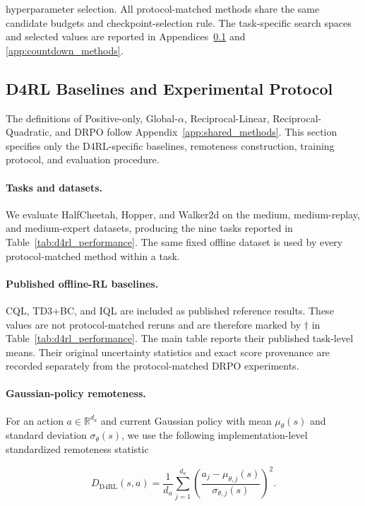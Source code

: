 hyperparameter selection. All protocol-matched methods share the same
candidate budgets and checkpoint-selection rule. The task-specific
search spaces and selected values are reported in
Appendices~\ref{app:d4rl_methods} and
\ref{app:countdown_methods}.


\subsection{D4RL Baselines and Experimental Protocol}
\label{app:d4rl_methods}

The definitions of Positive-only, Global-\(\alpha\),
Reciprocal-Linear, Reciprocal-Quadratic, and DRPO follow
Appendix~\ref{app:shared_methods}. This section specifies only the
D4RL-specific baselines, remoteness construction, training protocol,
and evaluation procedure.

\paragraph{Tasks and datasets.}

We evaluate HalfCheetah, Hopper, and Walker2d on the medium,
medium-replay, and medium-expert datasets, producing the nine tasks
reported in Table~\ref{tab:d4rl_performance}. The same fixed offline
dataset is used by every protocol-matched method within a task.

\paragraph{Published offline-RL baselines.}

CQL, TD3+BC, and IQL are included as published reference results.
These values are not protocol-matched reruns and are therefore marked
by \(\dagger\) in Table~\ref{tab:d4rl_performance}. The main table
reports their published task-level means. Their original uncertainty
statistics and exact score provenance are recorded separately from the
protocol-matched DRPO experiments.

\paragraph{Gaussian-policy remoteness.}

For an action \(a\in\mathbb{R}^{d_a}\) and current Gaussian policy with
mean \(\mu_\theta(s)\) and standard deviation \(\sigma_\theta(s)\), we use the
following implementation-level standardized remoteness statistic

\[
D_{\mathrm{D4RL}}(s,a)
=
\frac{1}{d_a}
\sum_{j=1}^{d_a}
\left(
\frac{a_j-\mu_{\theta,j}(s)}
     {\sigma_{\theta,j}(s)}
\right)^2.
\]

